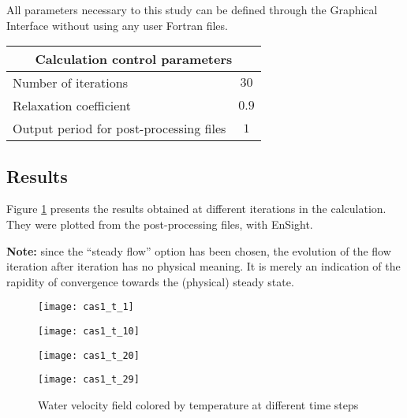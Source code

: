 All parameters necessary to this study can be defined through the Graphical
Interface without using any user Fortran files.

\begin{center}
\begin{tabular}{|l|c|}
\hline
\multicolumn{2}{|c|}{Calculation control parameters} \\
\hline
Number of iterations & $30$ \\
\hline
Relaxation coefficient & $0.9$ \\
\hline
Output period for post-processing files& $1$ \\
\hline
\end{tabular}
\end{center}



        \subsection{Results}

Figure \ref{fige1_e1} presents the results obtained at different iterations in the
calculation. They were plotted from the post-processing files, with EnSight.

\textbf{Note:} since the ``steady flow'' option has been chosen, the evolution
of the flow iteration after iteration has no physical meaning. It is merely an
indication of the rapidity of convergence towards the (physical) steady state.

\begin{figure}[h]
\parbox{0.5\textwidth}{%
\texttt{[image: cas1\_t\_1]}}
\parbox{0.5\textwidth}{%
\texttt{[image: cas1\_t\_10]}}
\vspace*{0.5cm}
\parbox{0.5\textwidth}{%
\texttt{[image: cas1\_t\_20]}}
\parbox{0.5\textwidth}{%
\texttt{[image: cas1\_t\_29]}}
\caption{\label{fige1_e1}Water velocity field colored by temperature at different time steps}
\end{figure}


